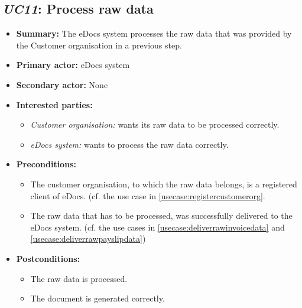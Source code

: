\documentclass[a4paper,10pt]{article}
\begin{document}
\subsection{\emph{UC11}: Process raw data}
\label{usecase:processrawdata}
\begin{itemize}
    \item \textbf{Summary:} The eDocs system processes the raw data that was provided by the Customer organisation in a previous step.
    \item \textbf{Primary actor:} eDocs system
    \item \textbf{Secondary actor:} None
    \item \textbf{Interested parties:} 
        \begin{itemize}
            \item \textit{Customer organisation:} wants its raw data to be processed correctly.
            \item \textit{eDocs system:} wants to process the raw data correctly.
        \end{itemize}
    \item \textbf{Preconditions:}
        \begin{itemize}
            \item The customer organisation, to which the raw data belongs, is a registered client of eDocs. (cf. the use case in \ref{usecase:registercustomerorg}.
            \item The raw data that has to be processed, was successfully delivered to the eDocs system. (cf. the use cases in \ref{usecase:deliverrawinvoicedata} and \ref{usecase:deliverrawpayslipdata})
        \end{itemize}
    \item \textbf{Postconditions:}
        \begin{itemize}
            \item The raw data is processed.
            \item The document is generated correctly.
        \end{itemize}
        

\end{itemize}
\end{document}
